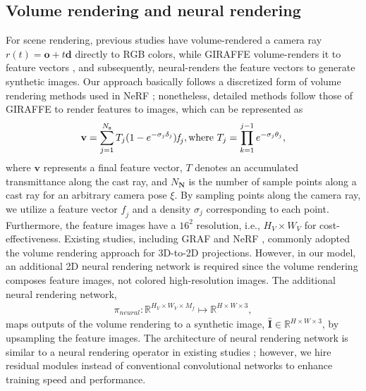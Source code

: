 \documentclass[nohyperref]{article}
\theoremstyle{plain}
\theoremstyle{definition}
\theoremstyle{remark}
\begin{document}
\subsection{Volume rendering and neural rendering}
For scene rendering, previous studies \cite{schwarz2020graf} have volume-rendered a camera ray $r(t) = \textbf{o} + t\textbf{d}$ directly to RGB colors, while GIRAFFE volume-renders it to feature vectors \cite{niemeyer2021giraffe}, and subsequently, neural-renders the feature vectors to generate synthetic images. Our approach basically follows a discretized form of volume rendering methods used in NeRF \cite{mildenhall2021nerf}; nonetheless, detailed methods follow those of GIRAFFE to render features to images, which can be represented as
\begin{align}
    \textbf{v} = \sum_{j=1}^{N_{\textbf{s}}}T_{j}(1-e^{-\sigma_{j}\delta_{j}})\textit{f}_{j}, \textnormal{where } T_{j} = \prod_{k=1}^{j-1}e^{-\sigma_{j}\theta_{j}},
\end{align}
where $\textbf{v}$ represents a final feature vector, $T$ denotes an accumulated transmittance along the cast ray, and $N_{\textbf{N}}$ is the number of sample points along a cast ray for an arbitrary camera pose $\xi$. By sampling points along the camera ray, we utilize a feature vector $\textit{f}_{j}$ and a density $\sigma_{j}$ corresponding to each point. Furthermore, the feature images have a $16^{2}$ resolution, i.e., $H_{V} \times W_{V}$ for cost-effectiveness.
Existing studies, including GRAF and NeRF \cite{schwarz2020graf, mildenhall2021nerf}, commonly adopted the volume rendering approach for 3D-to-2D projections. However, in our model, an additional 2D neural rendering network is required since the volume rendering composes feature images, not colored high-resolution images. The additional neural rendering network,
\begin{align}
    \pi_{neural}: \mathbb{R}^{H_{V}\times W_{V}\times M_{f}} \mapsto \mathbb{R}^{H\times W\times 3},
\end{align}
maps outputs of the volume rendering to a synthetic image, $\hat{\textbf{I}} \in \mathbb{R}^{H \times W\times 3}$, by upsampling the feature images. The architecture of neural rendering network is similar to a neural rendering operator in existing studies \cite{niemeyer2021giraffe}; however, we hire residual modules instead of conventional convolutional networks to enhance training speed and performance.
\end{document}
